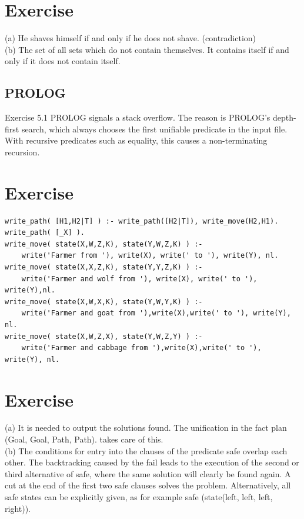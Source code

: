\documentclass[10pt]{book}
\begin{document}
\section{Exercise}
(a) He shaves himself if and only if he does not shave. (contradiction)\\
(b) The set of all sets which do not contain themselves. It contains itself if and only if it does not contain itself.

\subsection{PROLOG}
Exercise 5.1 PROLOG signals a stack overflow. The reason is PROLOG's depth-first search, which always chooses the first unifiable predicate in the input file. With recursive predicates such as equality, this causes a non-terminating recursion.

\section{Exercise}
\begin{verbatim}
write_path( [H1,H2|T] ) :- write_path([H2|T]), write_move(H2,H1).
write_path( [_X] ).
write_move( state(X,W,Z,K), state(Y,W,Z,K) ) :-
    write('Farmer from '), write(X), write(' to '), write(Y), nl.
write_move( state(X,X,Z,K), state(Y,Y,Z,K) ) :-
    write('Farmer and wolf from '), write(X), write(' to '), write(Y),nl.
write_move( state(X,W,X,K), state(Y,W,Y,K) ) :-
    write('Farmer and goat from '),write(X),write(' to '), write(Y), nl.
write_move( state(X,W,Z,X), state(Y,W,Z,Y) ) :-
    write('Farmer and cabbage from '),write(X),write(' to '), write(Y), nl.
\end{verbatim}

\section{Exercise}
(a) It is needed to output the solutions found. The unification in the fact plan (Goal, Goal, Path, Path). takes care of this.\\
(b) The conditions for entry into the clauses of the predicate safe overlap each other. The backtracking caused by the fail leads to the execution of the second or third alternative of safe, where the same solution will clearly be found again. A cut at the end of the first two safe clauses solves the problem. Alternatively, all safe states can be explicitly given, as for example safe (state(left, left, left, right)).
\end{document}

